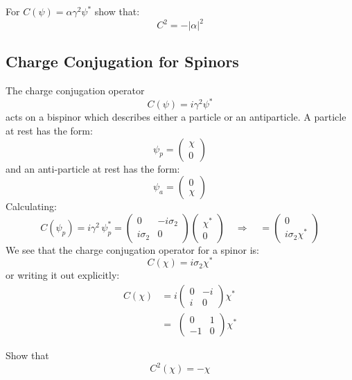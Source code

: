 \documentclass[12pt]{article}
\begin{document}
\exercise For $C(\psi) = \alpha \gamma^2 \psi^*$ show that:
$$C^2 = -|\alpha|^2$$

\subsection*{Charge Conjugation for Spinors}
The charge conjugation operator
\begin{equation*}
  C(\psi) = i\gamma^2\psi^*
\end{equation*}
acts on a bispinor which describes either a particle or an
antiparticle.  A particle at rest has the form:
$$\psi_p = \begin{pmatrix} \chi \\ 0 \end{pmatrix}$$
and an anti-particle at rest has the form:
$$\psi_a = \begin{pmatrix} 0 \\ \chi \end{pmatrix}$$
Calculating:
\begin{equation*}
  C(\psi_p) = i\gamma^2 \, \psi_p^* =
  \begin{pmatrix} 0 & -i\sigma_2 \\ i\sigma_2 & 0 \end{pmatrix}
  \begin{pmatrix} \chi^* \\ 0 \end{pmatrix}
  \quad\Rightarrow\quad
  = 
  \begin{pmatrix} 0 \\ i \sigma_2 \chi^* \end{pmatrix}
\end{equation*}
We see that the charge conjugation operator for a spinor is:
\begin{equation}
\label{eqn:c_spinor}
  C(\chi) = i\sigma_2 \chi^*
\end{equation}
or writing it out explicitly:
\begin{align*}
  C(\chi) &= i\begin{pmatrix} 0 & -i \\ i & 0 \end{pmatrix}\chi^* \\[7pt]
  &= \phantom{i}\begin{pmatrix} 0 & 1 \\ -1 & 0 \end{pmatrix}\chi^* 
\end{align*}

\exercise Show that
$$C^2(\chi) = -\chi$$
\end{document}
